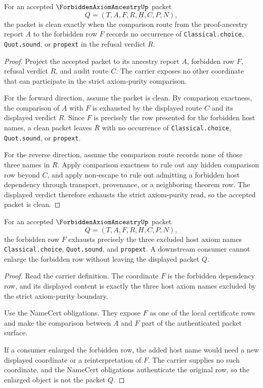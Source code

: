 \begin{theorem}
\label{thm:forbidden-axiom-ancestry-accepted-clean-criterion}
For an accepted $\ForbiddenAxiomAncestryUp$ packet
$$
Q=(T,A,F,R,H,C,P,N),
$$
the packet is clean exactly when the comparison route from the proof-ancestry report $A$ to the forbidden row $F$ records no occurrence of \texttt{Classical.choice}, \texttt{Quot.sound}, or \texttt{propext} in the refusal verdict $R$.
\end{theorem}
\begin{proof}
Project the accepted packet to its ancestry report $A$, forbidden row $F$, refusal verdict $R$, and audit route $C$. The carrier exposes no other coordinate that can participate in the strict axiom-purity comparison.

For the forward direction, assume the packet is clean. By comparison exactness, the comparison of $A$ with $F$ is exhausted by the displayed route $C$ and its displayed verdict $R$. Since $F$ is precisely the row presented for the forbidden host names, a clean packet leaves $R$ with no occurrence of \texttt{Classical.choice}, \texttt{Quot.sound}, or \texttt{propext}.

For the reverse direction, assume the comparison route records none of those three names in $R$. Apply comparison exactness to rule out any hidden comparison row beyond $C$, and apply non-escape to rule out admitting a forbidden host dependency through transport, provenance, or a neighboring theorem row. The displayed verdict therefore exhausts the strict axiom-purity read, so the accepted packet is clean.
\end{proof}

\begin{theorem}
\label{thm:forbidden-axiom-ancestry-forbidden-row-coverage}
For an accepted $\ForbiddenAxiomAncestryUp$ packet
$$
Q=(T,A,F,R,H,C,P,N),
$$
the forbidden row $F$ exhausts precisely the three excluded host axiom names \texttt{Classical.choice}, \texttt{Quot.sound}, and \texttt{propext}. A downstream consumer cannot enlarge the forbidden row without leaving the displayed packet $Q$.
\end{theorem}
\begin{proof}
Read the carrier definition. The coordinate $F$ is the forbidden dependency row, and its displayed content is exactly the three host axiom names excluded by the strict axiom-purity boundary.

Use the NameCert obligations. They expose $F$ as one of the local certificate rows and make the comparison between $A$ and $F$ part of the authenticated packet surface.

If a consumer enlarged the forbidden row, the added host name would need a new displayed coordinate or a reinterpretation of $F$. The carrier supplies no such coordinate, and the NameCert obligations authenticate the original row, so the enlarged object is not the packet $Q$.
\end{proof}

